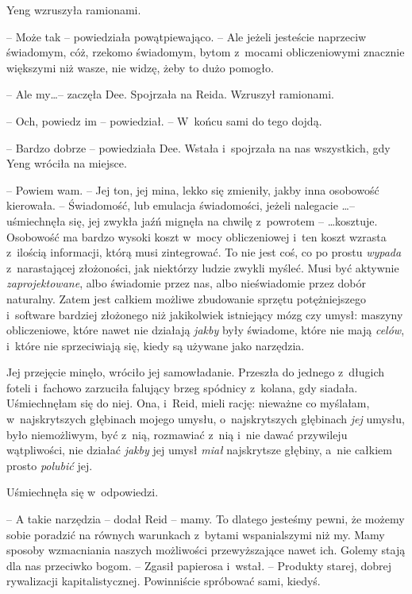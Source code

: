 \documentclass[oneside,polish,11pt,sfheadings]{mwbk}
\begin{document}
Yeng wzruszyła ramionami. 

-- Może tak -- powiedziała powątpiewająco. -- Ale
jeżeli jesteście naprzeciw świadomym, cóż, rzekomo świadomym, bytom z~mocami obliczeniowymi znacznie większymi niż wasze, nie widzę, żeby to
dużo pomogło.

-- Ale my\ldots  -- zaczęła Dee. Spojrzała na Reida. Wzruszył ramionami.

-- Och, powiedz im -- powiedział. -- W~końcu sami do tego dojdą.

-- Bardzo dobrze -- powiedziała Dee. Wstała i~spojrzała na nas wszystkich,
gdy Yeng wróciła na miejsce. 

-- Powiem wam. -- Jej ton, jej mina, lekko
się zmieniły, jakby inna osobowość kierowała. -- Świadomość, lub emulacja
świadomości, jeżeli nalegacie \ldots  -- uśmiechnęła się, jej zwykła jaźń
mignęła na chwilę z~powrotem -- \ldots  kosztuje. Osobowość ma bardzo wysoki
koszt w~mocy obliczeniowej i~ten koszt wzrasta z~ilością informacji,
którą musi zintegrować. To nie jest coś, co po prostu \textit{wypada} z~narastającej złożoności, jak niektórzy ludzie zwykli myśleć. Musi być
aktywnie \textit{zaprojektowane}, albo świadomie przez nas, albo
nieświadomie przez dobór naturalny. Zatem jest całkiem możliwe
zbudowanie sprzętu potężniejszego i~software bardziej złożonego niż
jakikolwiek istniejący mózg czy umysł: maszyny obliczeniowe, które nawet
nie działają \textit{jakby} były świadome, które nie mają \textit{celów}, i~które nie sprzeciwiają się, kiedy są używane jako narzędzia.

Jej przejęcie minęło, wróciło jej samowładanie. Przeszła do jednego z~długich foteli i~fachowo zarzuciła falujący brzeg spódnicy z~kolana, gdy
siadała. Uśmiechnęłam się do niej. Ona, i~Reid, mieli rację: nieważne co
myślałam, w~najskrytszych głębinach mojego umysłu, o~najskrytszych
głębinach \textit{jej} umysłu, było niemożliwym, być z~nią, rozmawiać z~nią i~nie dawać przywileju wątpliwości, nie działać \textit{jakby }jej
umysł \textit{miał} najskrytsze głębiny, a~nie całkiem prosto
\textit{polubić} jej.

Uśmiechnęła się w~odpowiedzi.

-- A takie narzędzia -- dodał Reid -- mamy. To dlatego jesteśmy pewni, że
możemy sobie poradzić na równych warunkach z~bytami wspanialszymi niż
my. Mamy sposoby wzmacniania naszych możliwości przewyższające nawet
ich. Golemy stają dla nas przeciwko bogom. -- Zgasił papierosa i~wstał. -- Produkty starej, dobrej rywalizacji kapitalistycznej. Powinniście
spróbować sami, kiedyś.
\end{document}
